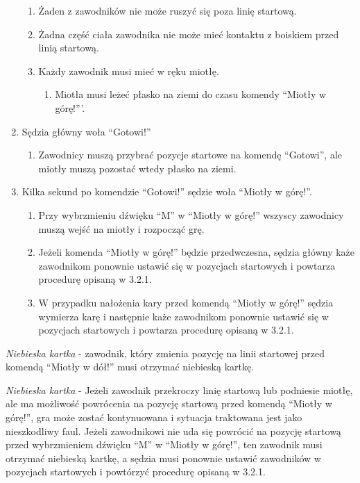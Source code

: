 \documentclass[12pt]{article}
\begin{document}
\begin{enumerate}
  \begin{enumerate}
  \item
        Żaden z zawodników nie może ruszyć się poza linię startową.
      \item
        Żadna część ciała zawodnika nie może mieć kontaktu z boiskiem przed
    linią startową.
      \item
        Każdy zawodnik musi mieć w ręku miotłę.
    
    \begin{enumerate}
    \item
            Miotła musi leżeć płasko na ziemi do czasu komendy ``Miotły w
      górę!'''.
          \end{enumerate}
  \end{enumerate}
\item
    Sędzia główny woła ``Gotowi!''
  
  \begin{enumerate}
  \item
        Zawodnicy muszą przybrać pozycje startowe na komendę ``Gotowi'', ale
    miotły muszą pozostać wtedy płasko na ziemi.
      \end{enumerate}
\item
    Kilka sekund po komendzie ``Gotowi!'' sędzie woła ``Miotły w górę!''.
  
  \begin{enumerate}
  \item
        Przy wybrzmieniu dźwięku ``M'' w ``Miotły w górę!'' wszyscy
    zawodnicy muszą wejść na miotły i rozpocząć grę.
      \item
        Jeżeli komenda ``Miotły w górę!'' będzie przedwczesna, sędzia główny
    każe zawodnikom ponownie ustawić się w pozycjach startowych i
    powtarza procedurę opisaną w 3.2.1.
      \item
        W przypadku nałożenia kary przed komendą ``Miotły w górę!'' sędzia
    wymierza karę i następnie każe zawodnikom ponownie ustawić się w
    pozycjach startowych i powtarza procedurę opisaną w 3.2.1.
      \end{enumerate}
\end{enumerate}

\emph{Niebieska kartka} - zawodnik, który zmienia pozycję na linii
startowej przed komendą ``Miotły w dół!'' musi otrzymać niebieską
kartkę.

\emph{Niebieska kartka} - Jeżeli zawodnik przekroczy linię startową lub
podniesie miotłę, ale ma możliwość powrócenia na pozycję startową przed
komendą ``Miotły w górę!'', gra może zostać kontynuowana i sytuacja
traktowana jest jako nieszkodliwy faul. Jeżeli zawodnikowi nie uda się
powrócić na pozycję startową przed wybrzmieniem dźwięku ``M'' w ``Miotły
w górę!'', ten zawodnik musi otrzymać niebieską kartkę, a sędzia musi
ponownie ustawić zawodników w pozycjach startowych i powtórzyć procedurę
opisaną w 3.2.1.
\end{document}
